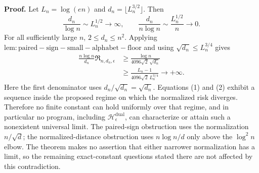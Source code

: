 \textbf{Proof.}
Let \(L_n=\log(en)\) and \(d_n=\lfloor L_n^{3/2}\rfloor\).  Then
\[
 \frac{d_n}{\log n}\sim L_n^{1/2}\longrightarrow\infty,
 \qquad
 \frac{d_n}{n\log n}\sim\frac{L_n^{1/2}}n\longrightarrow0.
 \tag{1}
\]
For all sufficiently large \(n\), \(2\leq d_n\leq n^2\).  Applying
\(\mathrm{lem:paired-sign-small-alphabet-floor}\) and using
\(\sqrt{d_n}\leq L_n^{3/4}\) gives
\[
 \begin{aligned}
 \frac{n\log n}{d_n}\mathfrak R_{n,d_n,\epsilon}
 &\geq\frac{\log n}{4096\sqrt2\,\sqrt{d_n}}\\
 &\geq\frac{L_n-1}{4096\sqrt2\,L_n^{3/4}}
 \longrightarrow+\infty.
 \end{aligned}
 \tag{2}
\]
Here the first denominator uses \(d_n/\sqrt{d_n}=\sqrt{d_n}\).  Equations (1) and (2) exhibit a sequence inside the proposed regime on which the normalized risk diverges.  Therefore no finite constant can hold uniformly over that regime, and in particular no program, including \(\mathscr H_\epsilon^{\mathrm{dual}}\), can characterize or attain such a nonexistent universal limit.  The paired-sign obstruction uses the normalization \(n/\sqrt d\); the normalized-distance obstruction uses \(n\log n/d\) only above the \(\log^2 n\) elbow.  The theorem makes no assertion that either narrower normalization has a limit, so the remaining exact-constant questions stated there are not affected by this contradiction.